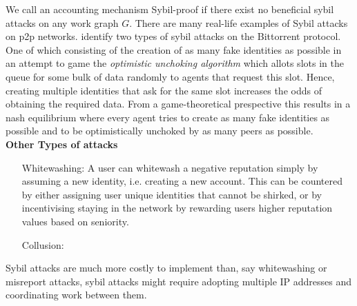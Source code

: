 \documentclass[11pt,a4paper]{report}
\theoremstyle{definition}
\theoremstyle{theorem}
\theoremstyle{proposition}
\theoremstyle{corollary}
\theoremstyle{lemma}
\theoremstyle{example}
\theoremstyle{remark}
\begin{document}
We call an accounting mechanism Sybil-proof if there exist no beneficial sybil attacks on any work graph $G$. There are many real-life examples of Sybil attacks on p2p networks. \cite{Bittorrent is an auction} identify two types of sybil attacks on the Bittorrent protocol. One of which consisting of the creation of as many fake identities as possible in an attempt to game the {\it optimistic unchoking algorithm} which allots slots in the queue for some bulk of data randomly to agents that request this slot. Hence, creating multiple identities that ask for the same slot increases the odds of obtaining the required data. From a game-theoretical prespective this results in a nash equilibrium where every agent tries to create as many fake identities as possible and to be optimistically unchoked by as many peers as possible. \vspace{1em}\\ 

\noindent{} {\bf Other Types of attacks}
\begin{itemize}
\item[Whitewashing:] A user can whitewash a negative reputation simply by assuming a new identity, i.e. creating a new account. This can be countered by either assigning user unique identities that cannot be shirked, or by incentivising staying in the network by rewarding users higher reputation values based on seniority.
\item[Collusion:] 
\end{itemize} 
Sybil attacks are much more costly to implement than, say whitewashing or misreport attacks, sybil attacks might require adopting multiple IP addresses and coordinating work between them.
\end{document}
